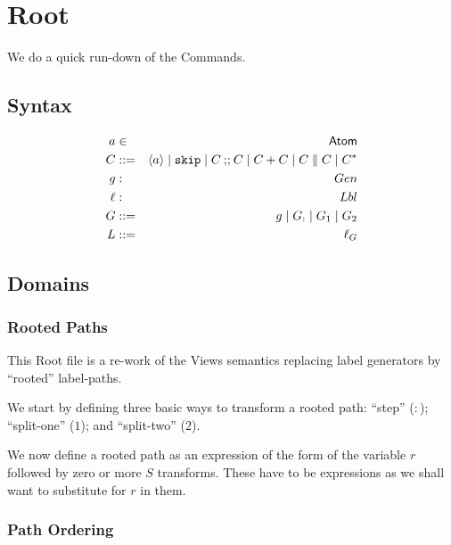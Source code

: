 \section{Root}\label{ha:Root}

We do a quick run-down of the Commands\cite{conf/popl/Dinsdale-YoungBGPY13}.

\subsection{Syntax}

\def\Atm#1{\langle#1\rangle}
\def\rr#1{r{\scriptstyle{#1}}}

\begin{eqnarray*}
   a &\in& \Atom
\\ C &::=&
 \Atm a \mid \cskip \mid C \cseq C \mid C+C \mid C \parallel C \mid C^*
\\ g &:& Gen
\\ \ell &:& Lbl
\\ G &::=&  g \mid G_{:} \mid G_1 \mid G_2
\\ L &::=& \ell_G
\end{eqnarray*}


\subsection{Domains}


\subsubsection{Rooted Paths}

This Root file is a re-work of the Views semantics
replacing label generators by ``rooted'' label-paths.

We start by defining three basic ways to transform a rooted path:
``step'' ($:$);
``split-one'' ($1$);
and ``split-two'' ($2$).

We now define a rooted path as an expression of the form
of the variable $r$ followed by zero or more $S$ transforms.
These have to be expressions as we shall want to substitute for $r$
in them.

\subsubsection{Path Ordering}

